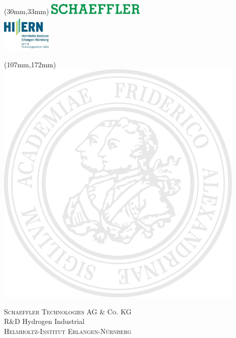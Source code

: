 \thispagestyle{empty}
\setcounter{page}{-1}

\begin{textblock*}{\textwidth}(30mm,33mm)
\vspace{3pt}
\includegraphics[width=47mm]{images/essential/schaeffler.png}\\[16pt]
\includegraphics[height=18mm]{images/essential/HIERN.jpg}
\end{textblock*}

\begin{textblock*}{\textwidth}(107mm,172mm)
\includegraphics[width=120mm]{images/essential/fausiegel.pdf}
\end{textblock*}

{\raggedleft
\textsc{Schaeffler Technologies AG \& Co. KG}\\
R\&D Hydrogen Industrial\\[12pt]
\textsc{Helmholtz-Institut Erlangen-Nürnberg}\\
\par}

\vspace{51mm}

